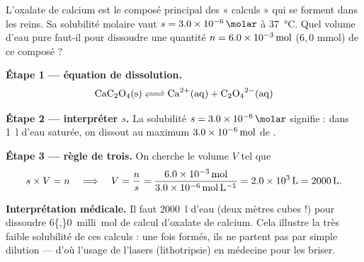 \documentclass[11pt,a4paper]{article}
\begin{document}
\begin{exemple}
L'oxalate de calcium  est le composé principal des « calculs » qui se forment dans les
reins. Sa solubilité molaire vaut $s=\qty{3{,}0e-6}{\molar}$ à \qty{37}{\degreeCelsius}. Quel volume
d'eau pure faut-il pour dissoudre une quantité $n=\qty{6{,}0e-3}{\mole}$ ($6{,}0$ mmol) de ce composé ?

\smallskip
\textbf{Étape 1 — équation de dissolution.}
\[ \ce{CaC2O4(s) <=> Ca^{2+}(aq) + C2O4^{2-}(aq)} \]

\textbf{Étape 2 — interpréter $s$.} La solubilité $s=\qty{3{,}0e-6}{\molar}$ signifie : dans
\qty{1}{\litre} d'eau saturée, on dissout au maximum $\qty{3{,}0e-6}{\mole}$ de .

\textbf{Étape 3 — règle de trois.} On cherche le volume $V$ tel que
\[ s \times V = n \quad\Longrightarrow\quad V = \dfrac{n}{s}
   = \dfrac{\qty{6{,}0e-3}{\mole}}{\qty{3{,}0e-6}{\mole\per\litre}}
   = \qty{2{,}0e3}{\litre} = \qty{2000}{\litre}. \]

\textbf{Interprétation médicale.} Il faut \qty{2000}{\litre} d'eau (deux mètres cubes !) pour
dissoudre \qty{6{,}0}{milli\mole} de calcul d'oxalate de calcium. Cela illustre la très faible
solubilité de ces calculs : une fois formés, ils ne partent pas par simple dilution — d'où l'usage de
l'lasers (lithotripsie) en médecine pour les briser.
\end{exemple}
\end{document}
